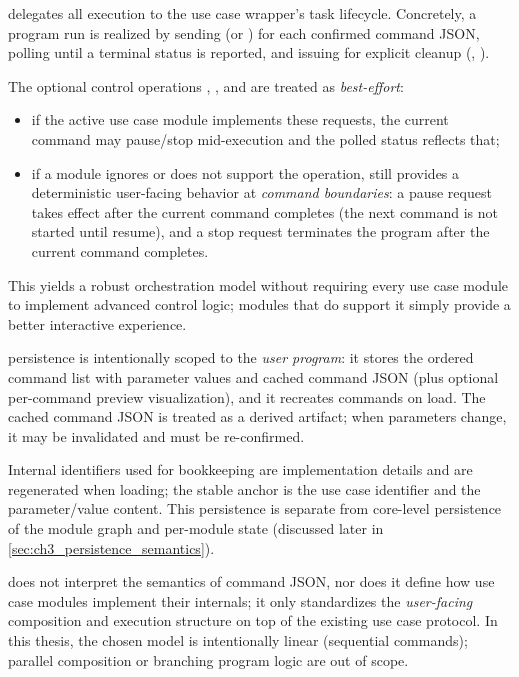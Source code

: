  delegates all execution to the use case wrapper's task lifecycle. Concretely, a program run is realized by sending  (or ) for each confirmed command JSON, polling  until a terminal status is reported, and issuing  for explicit cleanup (, ). 

The optional control operations , , and  are treated as \emph{best-effort}:
\begin{itemize}
    \item if the active use case module implements these requests, the current command may pause/stop mid-execution and the polled status reflects that;
    \item if a module ignores or does not support the operation,  still provides a deterministic user-facing behavior at \emph{command boundaries}: a pause request takes effect after the current command completes (the next command is not started until resume), and a stop request terminates the program after the current command completes.
\end{itemize}
This yields a robust orchestration model without requiring every use case module to implement advanced control logic; modules that do support it simply provide a better interactive experience.


 persistence is intentionally scoped to the \emph{user program}: it stores the ordered command list with parameter values and cached command JSON (plus optional per-command preview visualization), and it recreates commands on load. The cached command JSON is treated as a derived artifact; when parameters change, it may be invalidated and must be re-confirmed.

Internal identifiers used for bookkeeping are implementation details and are regenerated when loading; the stable anchor is the use case identifier and the parameter/value content. This persistence is separate from core-level persistence of the module graph and per-module state (discussed later in \autoref{sec:ch3_persistence_semantics}).

 does not interpret the semantics of command JSON, nor does it define how use case modules implement their internals; it only standardizes the \emph{user-facing} composition and execution structure on top of the existing use case protocol. In this thesis, the chosen model is intentionally linear (sequential commands); parallel composition or branching program logic are out of scope.



